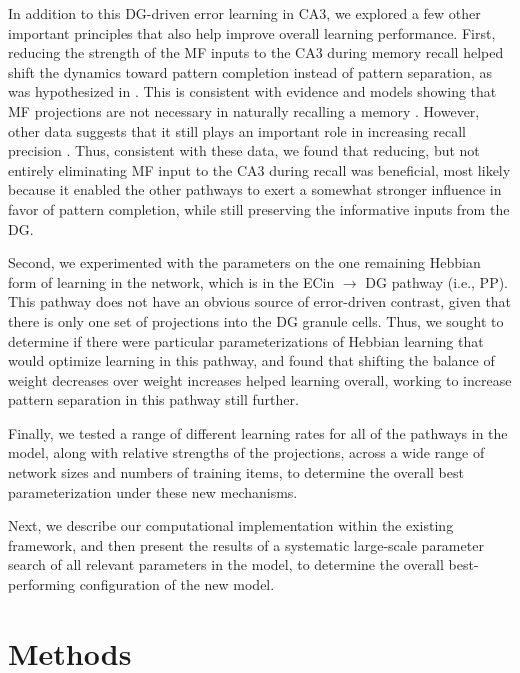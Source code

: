 \documentclass[11pt,twoside]{article}
\newif\myifpdf
\begin{document}
In addition to this DG-driven error learning in CA3, we explored a few other important principles that also help improve overall learning performance.  First, reducing the strength of the MF inputs to the CA3 during memory recall helped shift the dynamics toward pattern completion instead of pattern separation, as was hypothesized in \citet{OReillyMcClelland94}.  This is consistent with evidence and models showing that MF projections are not necessary in naturally recalling a memory \citep{NakashibaCushmanPelkeyEtAl12,BernierLacagninaAyoubEtAl17,Rolls13}.  However, other data suggests that it still plays an important role in increasing recall precision \citep{RuedigerVittoriBednarekEtAl11,NakashibaCushmanPelkeyEtAl12,BernierLacagninaAyoubEtAl17,PignatelliRyanRoyEtAl19}. Thus, consistent with these data, we found that reducing, but not entirely eliminating MF input to the CA3 during recall was beneficial, most likely because it enabled the other pathways to exert a somewhat stronger influence in favor of pattern completion, while still preserving the informative inputs from the DG.

Second, we experimented with the parameters on the one remaining Hebbian form of learning in the network, which is in the ECin $\rightarrow$ DG pathway (i.e., PP).  This pathway does not have an obvious source of error-driven contrast, given that there is only one set of projections into the DG granule cells.  Thus, we sought to determine if there were particular parameterizations of Hebbian learning that would optimize learning in this pathway, and found that shifting the balance of weight decreases over weight increases helped learning overall, working to increase pattern separation in this pathway still further.

Finally, we tested a range of different learning rates for all of the pathways in the model, along with relative strengths of the projections, across a wide range of network sizes and numbers of training items, to determine the overall best parameterization under these new mechanisms.

Next, we describe our computational implementation within the existing \citet{KetzMorkondaOReilly13} framework, and then present the results of a systematic large-scale parameter search of all relevant parameters in the model, to determine the overall best-performing configuration of the new model. 

\section{Methods}
\end{document}
